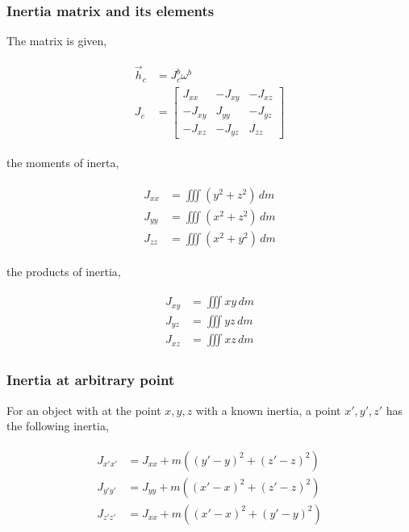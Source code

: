 \subsubsection{Inertia matrix and its elements}

The matrix is given,

\begin{align}
    \begin{split}
        \Vec{h}_c &= J_c^b \omega^b
        \\
        J_c &= \begin{bmatrix}
            J_{xx} & -J_{xy} & -J_{xz}
            \\
            -J_{xy} & J_{yy} & -J_{yz}
            \\
            -J_{xz} & -J_{yz} & J_{zz}
        \end{bmatrix}
    \end{split}
\end{align}

the moments of inerta,

\begin{align}
    \begin{split}
        J_{xx} &= \iiint (y^2 + z^2)\, dm
        \\
        J_{yy} &= \iiint (x^2 + z^2)\, dm
        \\
        J_{zz} &= \iiint (x^2 + y^2)\, dm
    \end{split}
\end{align}

the products of inertia,

\begin{align}
    \begin{split}
        J_{xy} &= \iiint xy \, dm
        \\
        J_{yz} &= \iiint yz \, dm
        \\
        J_{xz} &= \iiint xz \, dm
    \end{split}
\end{align}

\subsubsection{Inertia at arbitrary point}

For an object with at the point $x,y,z$ with a known inertia, a point $x', y', z'$ has the following inertia,

\begin{align}
    \begin{split}
        J_{x'x'} &= J_{xx} + m((y' - y)^2 + (z' - z)^2)
        \\
        J_{y'y'} &= J_{yy} + m((x' - x)^2 + (z' - z)^2)
        \\
        J_{z'z'} &= J_{xx} + m((x' - x)^2 + (y' - y)^2)
    \end{split}
\end{align}

